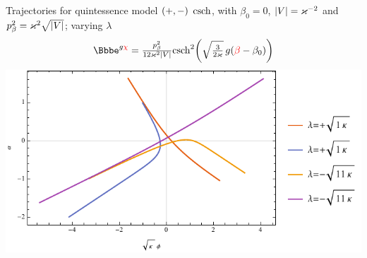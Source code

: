 \documentclass[8pt]{beamer}
\begin{document}
\begin{frame}%
{Trajectories for quintessence model ${\left(+,-\right)}$}%
{$\operatorname{csch}$, with $\beta_0 = 0$, ${\left|V\right|} = \varkappa^{-2}$ and
$p_\beta^2 = \varkappa^2\sqrt{{\left|V\right|}}$; varying $\lambda$}
\begin{align}
\ee^{g\textcolor{red}{\chi}} = 
\tfrac{p_\beta^2}{12\varkappa^2\vbr{V}}
\rfun{\csch^2}{ \sqrt{\tfrac{3}{2\varkappa}}\,g 
\rbr{\textcolor{red}{\beta}-\beta_0}}
\end{align}
\includegraphics[width=\textwidth]{../plots.nb/csch_lamb_l.pdf}

\end{frame}
\end{document}
